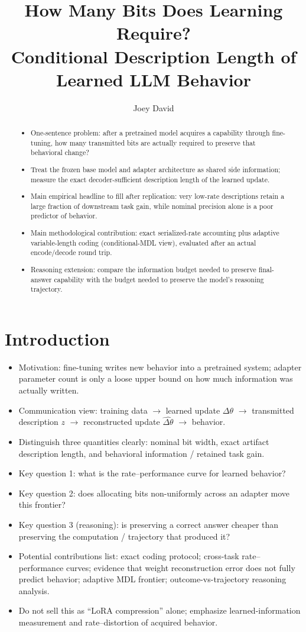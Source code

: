 \documentclass[10pt]{article}
\title{How Many Bits Does Learning Require?\\
\large Conditional Description Length of Learned LLM Behavior}
\author{Joey David \and \placeholder{coauthors}}
\date{}
\newcommand{\paperidea}[1]{\item #1}
\begin{document}
\maketitle

\begin{abstract}
\begin{itemize}
  \paperidea{One-sentence problem: after a pretrained model acquires a capability through fine-tuning, how many transmitted bits are actually required to preserve that behavioral change?}
  \paperidea{Treat the frozen base model and adapter architecture as shared side information; measure the exact decoder-sufficient description length of the learned update.}
  \paperidea{Main empirical headline to fill after replication: very low-rate descriptions retain a large fraction of downstream task gain, while nominal precision alone is a poor predictor of behavior.}
  \paperidea{Main methodological contribution: exact serialized-rate accounting plus adaptive variable-length coding (conditional-MDL view), evaluated after an actual encode/decode round trip.}
  \paperidea{Reasoning extension: compare the information budget needed to preserve final-answer capability with the budget needed to preserve the model's reasoning trajectory.}
\end{itemize}
\end{abstract}

\section{Introduction}
\begin{itemize}
  \paperidea{Motivation: fine-tuning writes new behavior into a pretrained system; adapter parameter count is only a loose upper bound on how much information was actually written.}
  \paperidea{Communication view: training data $\rightarrow$ learned update $\Delta\theta$ $\rightarrow$ transmitted description $z$ $\rightarrow$ reconstructed update $\widehat{\Delta\theta}$ $\rightarrow$ behavior.}
  \paperidea{Distinguish three quantities clearly: nominal bit width, exact artifact description length, and behavioral information / retained task gain.}
  \paperidea{Key question 1: what is the rate--performance curve for learned behavior?}
  \paperidea{Key question 2: does allocating bits non-uniformly across an adapter move this frontier?}
  \paperidea{Key question 3 (reasoning): is preserving a correct answer cheaper than preserving the computation / trajectory that produced it?}
  \paperidea{Potential contributions list: exact coding protocol; cross-task rate--performance curves; evidence that weight reconstruction error does not fully predict behavior; adaptive MDL frontier; outcome-vs-trajectory reasoning analysis.}
  \paperidea{Do not sell this as ``LoRA compression'' alone; emphasize learned-information measurement and rate--distortion of acquired behavior.}
\end{itemize}
\end{document}
